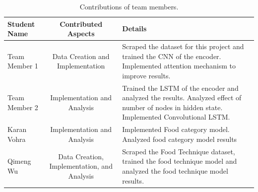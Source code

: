 \documentclass[10pt,twocolumn,letterpaper]{article}
\begin{document}
\begin{table}
\begin{center}
\begin{tabular}{|l|c|p{8cm}|}
\hline
Student Name & Contributed Aspects & Details \\
\hline\hline
Team Member 1 & Data Creation and Implementation & Scraped the dataset for this project and trained the CNN of the encoder. Implemented attention mechanism to improve results. \\
Team Member 2 & Implementation and Analysis & Trained the LSTM of the encoder and analyzed the results. Analyzed effect of number of nodes in hidden state.  Implemented Convolutional LSTM. \\
Karan Vohra & Implementation and Analysis & Implemented Food category model. Analyzed food category model results \\
Qimeng Wu & Data Creation, Implementation, and Analysis & Scraped the Food Technique dataset, trained the food technique model and analyzed the food technique model results.
\end{tabular}
\end{center}
\caption{Contributions of team members.}
\label{tab:contributions}
\end{table}


\newpage
\newpage


{\small


}
\end{document}
